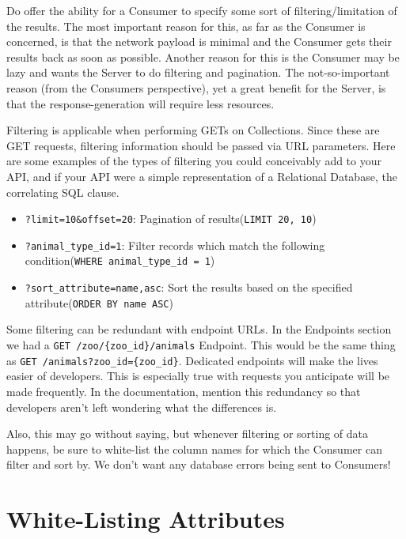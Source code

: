 \documentclass{book}
\begin{document}
Do offer the ability for a Consumer to specify some sort of filtering/limitation of the results. The most important reason for this, as far as the Consumer is concerned, is that the network payload is minimal and the Consumer gets their results back as soon as possible. Another reason for this is the Consumer may be lazy and wants the Server to do filtering and pagination. The not-so-important reason (from the Consumers perspective), yet a great benefit for the Server, is that the response-generation will require less resources.

Filtering is applicable when performing GETs on Collections. Since these are GET requests, filtering information should be passed via URL parameters. Here are some examples of the types of filtering you could conceivably add to your API, and if your API were a simple representation of a Relational Database, the correlating SQL clause.

\begin{itemize}
\item \texttt{?limit=10\&offset=20}: Pagination of results\newline{}(\texttt{LIMIT 20, 10})
\item \texttt{?animal\_type\_id=1}: Filter records which match the following condition\newline{}(\texttt{WHERE animal\_type\_id = 1})
\item \texttt{?sort\_attribute=name,asc}: Sort the results based on the specified attribute\newline{}(\texttt{ORDER BY name ASC})
\end{itemize}

Some filtering can be redundant with endpoint URLs. In the Endpoints section we had a \texttt{GET /zoo/\{zoo\_id\}/animals} Endpoint. This would be the same thing as \texttt{GET /animals?zoo\_id=\{zoo\_id\}}. Dedicated endpoints will make the lives easier of developers. This is especially true with requests you anticipate will be made frequently. In the documentation, mention this redundancy so that developers aren't left wondering what the differences is.

Also, this may go without saying, but whenever filtering or sorting of data happens, be sure to white-list the column names for which the Consumer can filter and sort by. We don't want any database errors being sent to Consumers!


\section{White-Listing Attributes}
\end{document}
